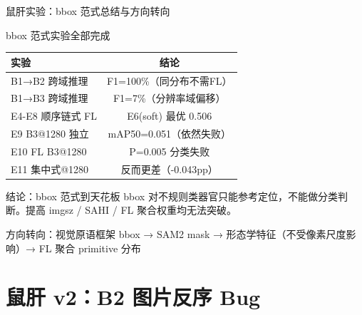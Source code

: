\documentclass[aspectratio=169, 10pt]{beamer}
\begin{document}
\begin{frame}{鼠肝实验：bbox 范式总结与方向转向}
  \begin{block}{bbox 范式实验全部完成}
    \begin{tabular}{lc}
      \toprule
      \textbf{实验} & \textbf{结论} \\
      \midrule
      B1→B2 跨域推理 & F1=100\%（同分布不需FL） \\
      B1→B3 跨域推理 & F1=7\%（分辨率域偏移） \\
      E4-E8 顺序链式 FL & E6(soft) 最优 0.506 \\
      E9 B3@1280 独立 & mAP50=0.051（依然失败） \\
      E10 FL B3@1280 & P=0.005 分类失败 \\
      E11 集中式@1280 & 反而更差（-0.043pp） \\
      \bottomrule
    \end{tabular}
  \end{block}
  \vspace{0em}
  \begin{alertblock}{结论：bbox 范式到天花板}
    bbox 对不规则类器官只能参考定位，不能做分类判断。提高 imgsz / SAHI / FL 聚合权重均无法突破。
  \end{alertblock}
  \vspace{0em}
  \begin{block}{方向转向：视觉原语框架}
    bbox → SAM2 mask → 形态学特征（不受像素尺度影响）→ FL 聚合 primitive 分布
  \end{block}
\end{frame}

\section{鼠肝 v2：B2 图片反序 Bug}
\end{document}

